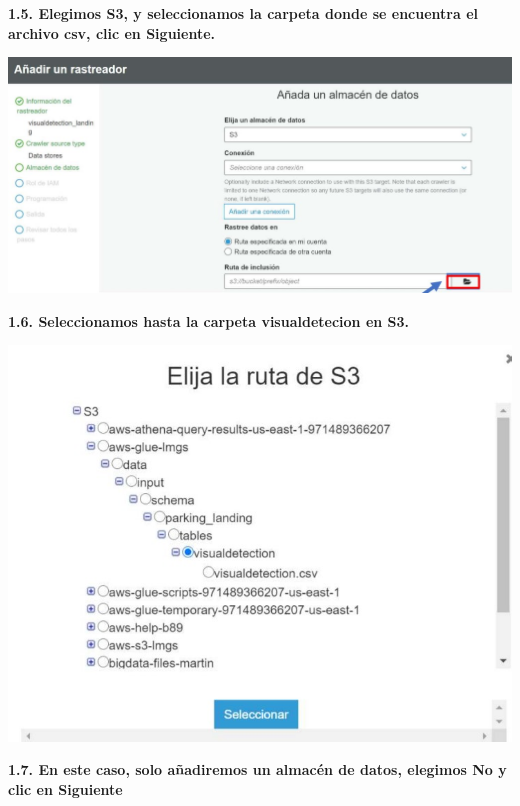 \documentclass{article}
\begin{document}
	\newpage
\textbf{1.5.  Elegimos S3, y seleccionamos la carpeta donde se encuentra el archivo csv, clic en Siguiente.
}

    \begin{center}
		\includegraphics[width=15cm]{./images/5} 
	\end{center}
	
	\newpage
\textbf{1.6.   Seleccionamos hasta la carpeta visualdetecion en S3.
}

    \begin{center}
		\includegraphics[width=15cm]{./images/6} 
	\end{center}
	
	\newpage
\textbf{1.7. En este caso, solo añadiremos un almacén de datos, elegimos No y clic en Siguiente
}
\end{document}
